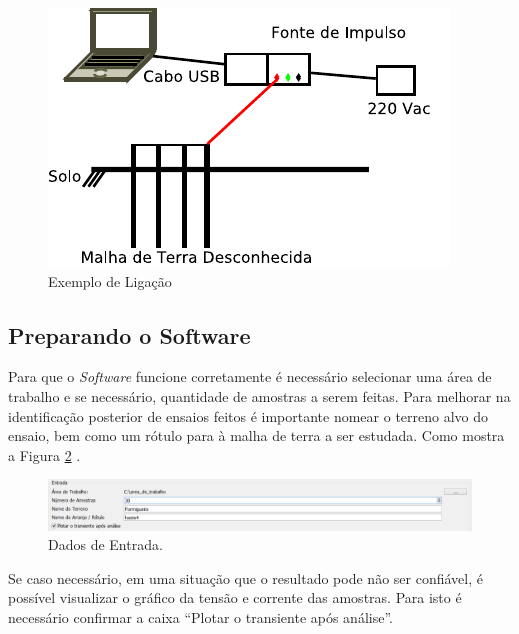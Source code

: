 \documentclass[a4paper, 10pt]{article}
\begin{document}
\begin{figure}[H]
        \caption{\label{fig_ligacao_hastes}Exemplo de Ligação}
	    \begin{center}
            \includegraphics[scale=1.2]{../fotos/conexoes/hastes.pdf}
	    \end{center}
\end{figure}

\subsection{Preparando o Software}

Para que o \textit{Software} funcione corretamente é necessário selecionar uma 
área de trabalho e se necessário, quantidade de amostras a serem feitas. 
Para melhorar na identificação posterior de ensaios feitos é importante nomear 
o terreno alvo do ensaio, bem como um rótulo para à malha de terra a ser 
estudada. Como mostra a Figura \ref{fig_entrando_os_dados} .

\begin{figure}[H]
        \caption{\label{fig_entrando_os_dados}Dados de Entrada.}
	    \begin{center}
            \includegraphics[scale=0.4]{../fotos/execucao/selecionando_area_trabalho_2.png}
	    \end{center}
\end{figure}

Se caso necessário, em uma situação que o resultado pode não ser confiável, 
é possível visualizar o gráfico da tensão e corrente das amostras. Para isto 
é necessário confirmar a caixa ``Plotar o transiente após análise''.
\end{document}
